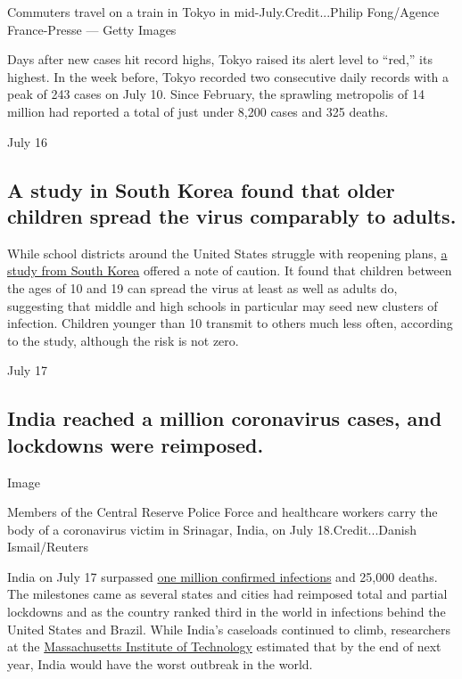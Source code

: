 Commuters travel on a train in Tokyo in mid-July.Credit...Philip
Fong/Agence France-Presse --- Getty Images

Days after new cases hit record highs, Tokyo raised its alert level to
``red,'' its highest. In the week before, Tokyo recorded two consecutive
daily records with a peak of 243 cases on July 10. Since February, the
sprawling metropolis of 14 million had reported a total of just under
8,200 cases and 325 deaths.

July 16

\hypertarget{a-study-in-south-korea-found-that-older-children-spread-the-virus-comparably-to-adults}{%
\subsection{A study in South Korea found that older children spread the
virus comparably to
adults.}\label{a-study-in-south-korea-found-that-older-children-spread-the-virus-comparably-to-adults}}

While school districts around the United States struggle with reopening
plans, \href{https://wwwnc.cdc.gov/eid/article/26/10/20-1315_article}{a
study from South Korea} offered a note of caution. It found that
children between the ages of 10 and 19 can spread the virus at least as
well as adults do, suggesting that middle and high schools in particular
may seed new clusters of infection. Children younger than 10 transmit to
others much less often, according to the study, although the risk is not
zero.

July 17

\hypertarget{india-reached-a-million-coronavirus-cases-and-lockdowns-were-reimposed}{%
\subsection{India reached a million coronavirus cases, and lockdowns
were
reimposed.}\label{india-reached-a-million-coronavirus-cases-and-lockdowns-were-reimposed}}

Image

Members of the Central Reserve Police Force and healthcare workers carry
the body of a coronavirus victim in Srinagar, India, on July
18.Credit...Danish Ismail/Reuters

India on July 17 surpassed
\href{https://www.nytimes3xbfgragh.onion/2020/07/16/world/asia/coronavirus-india-million-cases.html?action=click\&module=RelatedLinks\&pgtype=Article}{one
million confirmed infections} and 25,000 deaths. The milestones came as
several states and cities had reimposed total and partial lockdowns and
as the country ranked third in the world in infections behind the United
States and Brazil. While India's caseloads continued to climb,
researchers at the
\href{https://papers.ssrn.com/sol3/papers.cfm?abstract_id=3635047}{Massachusetts
Institute of Technology} estimated that by the end of next year, India
would have the worst outbreak in the world.

